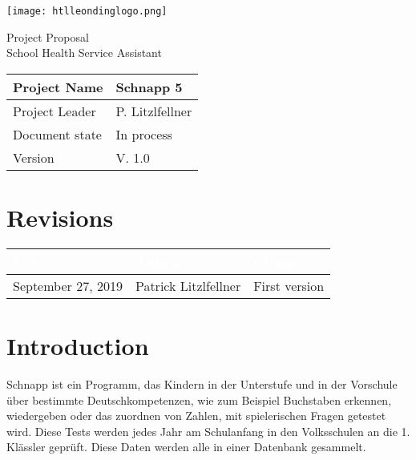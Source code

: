 \documentclass[12pt]{article}
\theoremstyle{definition}
\newcommand{\projectname}{Schnapp 5}
\newcommand{\productname}{School Health Service Assistant}
\newcommand{\projectleader}{P. Litzlfellner}
\newcommand{\documentstatus}{In process}
\newcommand{\version}{V. 1.0}
\begin{document}
\begin{titlepage}
\begin{flushright}
\texttt{[image: htlleondinglogo.png]}\\
\end{flushright}

\vspace{10em}

\begin{center}
{\Huge Project Proposal} \\[3em]
{\LARGE \productname} \\[3em]
\end{center}

\begin{flushleft}
\begin{tabular}{|l|l|}
\hline
Project Name & \projectname \\ \hline
Project Leader & \projectleader \\ \hline
Document state & \documentstatus \\ \hline
Version & \version \\ \hline
\end{tabular}
\end{flushleft}

\end{titlepage}
\section*{Revisions}
\begin{tabular}{|l|l|l|}
\hline
\cellcolor[gray]{0.5}\textcolor{white}{Date} & \cellcolor[gray]{0.5}\textcolor{white}{Author} & \cellcolor[gray]{0.5}\textcolor{white}{Change} \\ \hline
September 27, 2019&Patrick Litzlfellner &First version \\ \hline
\end{tabular}
\pagebreak

\tableofcontents
\pagebreak

\section{Introduction}



Schnapp ist ein Programm, das Kindern in der Unterstufe und in der Vorschule über bestimmte Deutschkompetenzen, wie zum Beispiel Buchstaben erkennen, wiedergeben oder das zuordnen von Zahlen, mit spielerischen Fragen getestet wird.
Diese Tests werden jedes Jahr am Schulanfang in den Volksschulen an die 1. Klässler geprüft.
Diese Daten werden alle in einer Datenbank gesammelt. 
\end{document}
